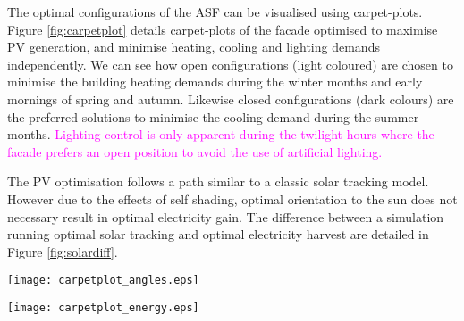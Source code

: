 


The optimal configurations of the ASF can be visualised using carpet-plots. Figure \ref{fig:carpetplot} details carpet-plots of the facade optimised to maximise PV generation, and minimise heating, cooling and lighting demands independently. We can see how open configurations (light coloured) are chosen to minimise the building heating demands during the winter months and early mornings of spring and autumn. Likewise closed configurations (dark colours) are the preferred solutions to minimise the cooling demand during the summer months. \textcolor{magenta}{Lighting control is only apparent during the twilight hours where the facade prefers an open position to avoid the use of artificial lighting.} 


The PV optimisation follows a path similar to a classic solar tracking model. However due to the effects of self shading, optimal orientation to the sun does not necessary result in optimal electricity gain. The difference between a simulation running optimal solar tracking and optimal electricity harvest are detailed in Figure \ref{fig:solardiff}.



\begin{figure*}
\begin{center}
\texttt{[image: carpetplot\_angles.eps]}
\caption{Carpet plots detailing the optimal configuration to minimise the (a) heating demand, (b) cooling demand, (c) lighting demand, and (d) maximise irradiance on PV panels. Each configuration is represented by an angle of orientation around the x-axis (Altitude) and y-axis (Azimuth) as seen in the legend. Figure (e) details the combinations for optimum building thermal management without PV production. (f) also includes the PV production}
\label{fig:carpetplot}
\end{center}
\end{figure*}

\begin{figure*}
\begin{center}
\texttt{[image: carpetplot\_energy.eps]}
\caption{Carpet plots detailing the net energy consumption. Each square represents the total energy consumption for that specific hour of the entire month. Red colours detail the energy demand, while blue colours detail the energy supply.}
\label{fig:carpetplot_energy}
\end{center}
\end{figure*}

